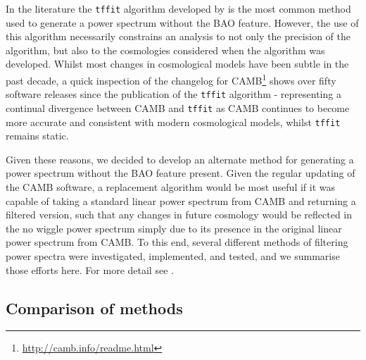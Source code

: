 \documentclass[iop,twocolappendix]{emulateapj}
\begin{document}
	In the literature the \verb;tffit; algorithm developed by \citet{EisensteinHu1998} is the most common method used to generate a power spectrum without the BAO feature. However, the use of this algorithm necessarily constrains an analysis to not only the precision of the algorithm, but also to the cosmologies considered when the algorithm was developed. Whilst most changes in cosmological models have been subtle in the past decade, a quick inspection of the changelog for CAMB\footnote{\url{http://camb.info/readme.html}} \citep{Lewis2000} shows over fifty software releases since the publication of the \verb;tffit; algorithm - representing a continual divergence between CAMB and \verb;tffit; as CAMB continues to become more accurate and consistent with modern cosmological models, whilst \verb;tffit; remains static. 
	
	Given these reasons, we decided to develop an alternate method for generating a power spectrum without the BAO feature present. Given the regular updating of the CAMB software, a replacement algorithm would be most useful if it was capable of taking a standard linear power spectrum from CAMB and returning a filtered version, such that any changes in future cosmology would be reflected in the no wiggle power spectrum simply due to its presence in the original linear power spectrum from CAMB. To this end, several different methods of filtering power spectra were investigated, implemented, and tested, and we summarise those efforts here.  For more detail see \citep{HintonThesis2015}. 
	
	\subsection{Comparison of methods}
	
\end{document}
